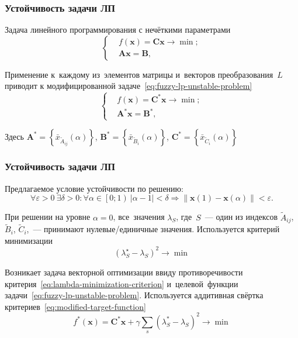 \documentclass[12pt]{beamer}
\begin{document}
\begin{frame}
  \frametitle{Устойчивость задачи ЛП}
  Задача линейного программирования с нечёткими параметрами
  \begin{equation}
    \left\{ \begin{aligned}
      & f\left( \mathbf{x} \right)=\mathbf{Cx}\to \min;  \\ 
      & \mathbf{Ax}=\mathbf{B},
    \end{aligned} \right.
  \end{equation}

  Применение к~каждому из~элементов матрицы и~векторов преобразования~$L$ приводит к модифицированной задаче~\eqref{eq:fuzzy-lp-unstable-problem}
  \begin{equation}
  \label{eq:fuzzy-lp-unstable-problem}
    \left\{ \begin{aligned}
      & f\left( \mathbf{x} \right)={\mathbf{C}^{*}}\mathbf{x}\to \min;  \\ 
      & {\mathbf{A}^{*}}\mathbf{x}={\mathbf{B}}^{*},
    \end{aligned} \right.
  \end{equation}
  
  Здесь $\mathbf{A}^{*}=\left\{ \bar{x}_{\tilde{A}_{ij}}\left(\alpha \right) \right\}$, $\mathbf{B}^{*}=\left\{ \bar{x}_{\tilde{B}_i}\left(\alpha \right) \right\}$, $\mathbf{C}^{*}=\left\{ \bar{x}_{\tilde{C}_i}\left(\alpha \right) \right\}$
\end{frame}

\begin{frame}
  \frametitle{Устойчивость задачи ЛП}
  Предлагаемое условие устойчивости по решению:
  \begin{equation}
  \label{eq:fuzzy-solution-stability}
    \forall \varepsilon >0\ \exists \delta >0:\forall \alpha \in \left[0; 1\right)\ \left| \alpha -1 \right|<\delta \Rightarrow \left\| \mathbf{x}\left( 1 \right)-\mathbf{x}\left( \alpha  \right) \right\|<\varepsilon.
  \end{equation}
  
  При решении на уровне $\alpha=0$, все~значения $\lambda_S$, где~$S$~--- один из индексов $\tilde A_{ij}$, $\tilde B_i$, $\tilde C_i$,~--- принимают нулевые/единичные значения. Используется критерий минимизации  
  \begin{equation}
  \label{eq:lambda-minimization-criterion}
    {\left( \lambda_{S}^{\star}-\lambda_S \right)}^2\to \min
  \end{equation}

  Возникает задача векторной оптимизации ввиду противоречивости критерия~\eqref{eq:lambda-minimization-criterion} и~целевой~функции задачи~\eqref{eq:fuzzy-lp-unstable-problem}. Используется аддитивная свёртка критериев~\eqref{eq:modified-target-function}
  \begin{equation}
  \label{eq:modified-target-function}
    f^{*}\left( \mathbf{x} \right)=\mathbf{C}^{*}\mathbf{x}+\gamma \sum\limits_{s}^{}{\left(\lambda_{S}^{*}-\lambda_S \right)}^{2} \to \min
  \end{equation}
\end{frame}
\end{document}
